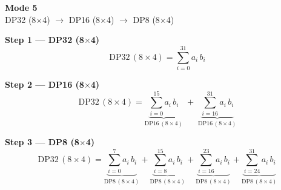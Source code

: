 \documentclass[fleqn]{article}
\newcommand{\DPop}[3]{\mathrm{DP#1}\,(#2\!\times\!#3)}
\begin{document}
\begin{center}
{\LARGE \textbf{Mode 5}}\\[4pt]
{\large DP32 (8$\times$4) $\rightarrow$ DP16 (8$\times$4) $\rightarrow$ DP8 (8$\times$4)}
\end{center}

\vspace{4em}

\noindent\textbf{Step 1 --- DP32 (8$\times$4)}
\[
\DPop{32}{8}{4} = \sum_{i=0}^{31} a_i \, b_i
\]

\vspace{0.5em}

\noindent\textbf{Step 2 --- DP16 (8$\times$4)}
\[
\DPop{32}{8}{4}
  = \underbrace{\sum_{i=0}^{15} a_i \, b_i}_{\DPop{16}{8}{4}}
  \; + \; \underbrace{\sum_{i=16}^{31} a_i \, b_i}_{\DPop{16}{8}{4}}
\]

\vspace{0.5em}

\noindent\textbf{Step 3 --- DP8 (8$\times$4)}
\[
\DPop{32}{8}{4}
  = \underbrace{\sum_{i=0}^{7} a_i \, b_i}_{\DPop{8}{8}{4}}
  + \underbrace{\sum_{i=8}^{15} a_i \, b_i}_{\DPop{8}{8}{4}}
  + \underbrace{\sum_{i=16}^{23} a_i \, b_i}_{\DPop{8}{8}{4}}
  + \underbrace{\sum_{i=24}^{31} a_i \, b_i}_{\DPop{8}{8}{4}}
\]
\end{document}
